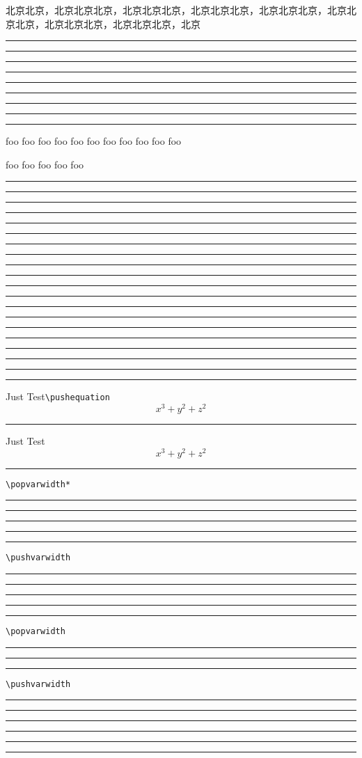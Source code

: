 \documentclass[UTF8,hyperref]{ctexart}
\def\testitem{\item\rule{\ecolswidth}{1pt}}
\begin{document}
\begin{enumcols}
\item
\item
\item 北京北京，北京北京北京，北京北京北京，北京北京北京，北京北京北京，北京北京北京，北京北京北京，北京北京北京，北京
\item
\item \lipsum[1]
\item
\item
\end{enumcols}

\begin{enumlist}
\item
\item
\item
\item
\begin{enumcols*}
\testitem
\item
\item
\item
\end{enumcols*}
\item
\item
\item
\item
\begin{enumlist}
\begin{enumcols*}[leftmargin=-\labelsep-\labelwidth,leftskip=0pt]
\testitem
\testitem
\testitem
\testitem
\end{enumcols*}
\end{enumlist}
\item
\item
\end{enumlist}
\begin{enumcols}[cols=4]
\testitem
\testitem
\testitem
\item \lipsum[1-5]
\testitem
\item foo foo foo foo foo foo foo foo foo foo foo
\item foo foo foo foo foo
\testitem
\testitem
\testitem
\testitem
\item  \lipsum[5-10]
\testitem
\testitem
\testitem
\testitem
\testitem
\testitem
\testitem
\testitem
\testitem
\testitem
\end{enumcols}
\begin{enumcols}[2]
\testitem
\testitem
\testitem
\testitem
\testitem
\testitem
\item Just Test\verb|\pushequation|\pushequation
\[
  x^3+y^2+z^2
\]
\testitem
\item Just Test
\[
  x^3+y^2+z^2
\]
\testitem
\item\verb|\popvarwidth*|\popvarwidth*%
\testitem
\testitem
\testitem
\testitem
\testitem
\item\verb|\pushvarwidth|\pushvarwidth
\testitem
\testitem
\testitem
\testitem
\testitem
\item\verb|\popvarwidth|\popvarwidth
\testitem
\testitem
\testitem
\item\verb|\pushvarwidth|\pushvarwidth
\testitem
\testitem
\testitem
\testitem
\testitem
\testitem
\end{enumcols}
\end{document}
